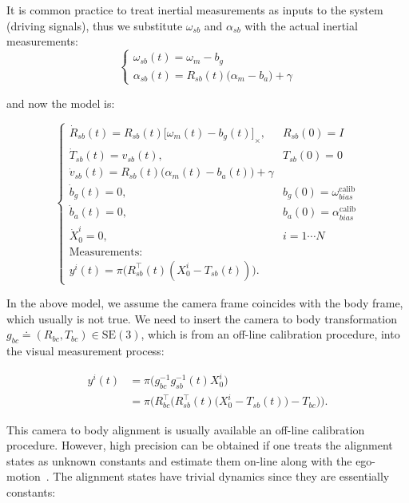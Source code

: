 \documentclass[letter,10pt]{article}
\newcommand{\SE}[1]{ \mathrm{SE(#1)} }
\newcommand{\asym}[1]{{\lbrack #1\rbrack}_\times{}}
\begin{document}
It is common practice to treat inertial measurements as inputs to the system (driving signals), thus we substitute $\omega_{sb}$ and $\alpha_{sb}$ with the actual inertial measurements:
\begin{equation*}
\begin{cases}
\omega_{sb}(t) = \omega_{m}-b_g\\
\alpha_{sb}(t) = R_{sb}(t)\big( \alpha_{m} - b_a\big) + \gamma
\end{cases}
\end{equation*}

and now the model is:

\begin{equation*}
\begin{cases}
\dot{R}_{sb}(t)=R_{sb}(t)\asym{\omega_{m}(t)-b_g(t)}, &R_{sb}(0)=I\\
\dot{T}_{sb}(t)=v_{sb}(t), &T_{sb}(0)=0\\
\dot{v}_{sb}(t)= R_{sb}(t)\big( \alpha_m(t) - b_a(t) \big) + \gamma\\
\dot b_g(t)=0, & b_g(0)=\omega_{bias}^{\text{calib}}\\
\dot b_a(t)=0, & b_a(0)=\alpha_{bias}^{\text{calib}}\\
\dot{X}_0^i=0, &i=1\cdots N\\
\text{Measurements:}\\
y^i(t)=\pi\big(R_{sb}^\top(t)(X_0^i-T_{sb}(t))\big).
\end{cases}
\end{equation*}

In the above model, we assume the camera frame coincides with the body frame, which usually is not true. We need to insert the camera to body transformation $g_{bc}\doteq (R_{bc}, T_{bc}) \in \SE{3}$, which is from an off-line calibration procedure, into the visual measurement process:

\begin{equation}
\begin{aligned}
y^i(t) 
&= \pi \Big( g_{bc}^{-1} g_{sb}^{-1}(t)X_0^i \Big)\\
&= \pi \Big(R_{bc}^\top \Big( R_{sb}^\top(t)\big( X_0^i - T_{sb}(t)\big)-T_{bc} \Big)\Big).
\end{aligned}
\label{eq-vismeas}
\end{equation}

This camera to body alignment is usually available an off-line calibration procedure. However, high precision can be obtained if one treats the alignment states as unknown constants and estimate them on-line along with the ego-motion~\cite{li2012improving}. The alignment states have trivial dynamics since they are essentially constants:
\end{document}
